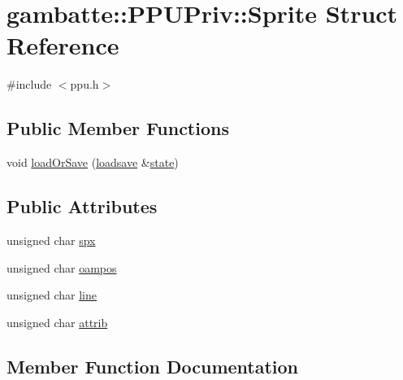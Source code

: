 \hypertarget{structgambatte_1_1PPUPriv_1_1Sprite}{}\section{gambatte\+:\+:P\+P\+U\+Priv\+:\+:Sprite Struct Reference}
\label{structgambatte_1_1PPUPriv_1_1Sprite}


{\ttfamily \#include $<$ppu.\+h$>$}

\subsection*{Public Member Functions}
\begin{DoxyCompactItemize}
\item 
void \hyperlink{structgambatte_1_1PPUPriv_1_1Sprite_a9e3b7d2d3bbbe17ca3e23480a2afa28c}{load\+Or\+Save} (\hyperlink{classgambatte_1_1loadsave}{loadsave} \&\hyperlink{ppu_8cpp_a2f2eca6997ee7baf8901725ae074d45b}{state})
\end{DoxyCompactItemize}
\subsection*{Public Attributes}
\begin{DoxyCompactItemize}
\item 
unsigned char \hyperlink{structgambatte_1_1PPUPriv_1_1Sprite_aa9f6c5acaecae4ca4ab8521616ae7036}{spx}
\item 
unsigned char \hyperlink{structgambatte_1_1PPUPriv_1_1Sprite_ac20457cc822cd213068bc2264fccf2d0}{oampos}
\item 
unsigned char \hyperlink{structgambatte_1_1PPUPriv_1_1Sprite_a720b7dfab129094396cf8903bd39b05e}{line}
\item 
unsigned char \hyperlink{structgambatte_1_1PPUPriv_1_1Sprite_aa748bc273a1fff5841f04f4bd18ebd6b}{attrib}
\end{DoxyCompactItemize}


\subsection{Member Function Documentation}
\mbox{\label{structgambatte_1_1PPUPriv_1_1Sprite_a9e3b7d2d3bbbe17ca3e23480a2afa28c}} 
